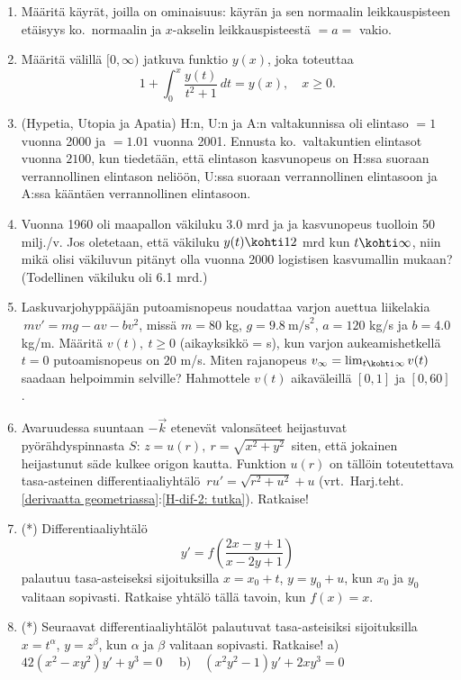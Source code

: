 \begin{enumerate}
\item
Määritä käyrät, joilla on ominaisuus: käyrän ja sen normaalin leikkauspisteen etäisyys ko.\
normaalin ja $x$-akselin leikkauspisteestä $=a=$ vakio.

\item {}
Määritä välillä $[0,\infty)$ jatkuva funktio $y(x)$, joka toteuttaa 
\[
1+\int_0^x \frac{y(t)}{t^2+1}\,dt = y(x), \quad x \ge 0.
\]

\item {}
(Hypetia, Utopia ja Apatia) H:n, U:n ja A:n valtakunnissa oli elintaso $=1$ vuonna 2000 ja
$=1.01$ vuonna 2001. Ennusta ko.\ valtakuntien elintasot vuonna $2100$, kun tiedetään, että
elintason kasvunopeus on H:ssa suoraan verrannollinen elintason neliöön, U:ssa suoraan
verrannollinen elintasoon ja A:ssa kääntäen verrannollinen elintasoon.

\item 
Vuonna 1960 oli maapallon väkiluku 3.0 mrd ja ja kasvunopeus tuolloin 50 milj./v. Jos
oletetaan, että väkiluku $y(t) \kohti 12$ mrd kun $t\kohti\infty$, niin mikä olisi väkiluvun
pitänyt olla vuonna 2000 logistisen kasvumallin mukaan? (Todellinen väkiluku oli 6.1 mrd.)

\item
Laskuvarjohyppääjän putoamisnopeus noudattaa varjon auettua liikelakia $\,mv'=mg-av-bv^2$,
missä $m=80$ kg, $g=9.8\ \text{m/s}^2$, $a=120$ kg/s ja $b=4.0$ kg/m. Määritä $v(t),\ t \ge 0$
(aikayksikkö = s), kun varjon aukeamishetkellä $t=0$ putoamisnopeus on $20$ m/s. 
Miten rajanopeus $v_\infty=\lim_{t\kohti\infty}v(t)$ saadaan helpoimmin selville? Hahmottele
$v(t)$ aikaväleillä $[0,1]$ ja $[0,60]$.

\item
Avaruudessa suuntaan $-\vec k$ etenevät valonsäteet heijastuvat pyörähdyspinnasta
$S:\,z=u(r),\ r=\sqrt{x^2+y^2}\,$ siten, että jokainen heijastunut säde kulkee origon
kautta. Funktion $u(r)$ on tällöin toteutettava tasa-asteinen differentiaaliyhtälö
$\,ru'=\sqrt{r^2+u^2}+u$
(vrt.\ Harj.teht.\,\ref{derivaatta geometriassa}:\ref{H-dif-2: tutka}). Ratkaise!

\item (*)
Differentiaaliyhtälö
\[
y'=f\left(\frac{2x-y+1}{x-2y+1}\right)
\]
palautuu tasa-asteiseksi sijoituksilla $x=x_0+t$, $y=y_0+u$, kun $x_0$ ja $y_0$ valitaan
sopivasti. Ratkaise yhtälö tällä tavoin, kun $f(x)=x$.

\item (*)
Seuraavat differentiaaliyhtälöt palautuvat tasa-asteisiksi sijoituksilla \newline
$x=t^\alpha$, $y=z^\beta$, kun $\alpha$ ja $\beta$ valitaan sopivasti. Ratkaise! \newline
a)\ \  $42(x^2-xy^2)y'+y^3=0 \quad$ b)\ \ $(x^2y^2-1)y'+2xy^3=0$


\end{enumerate}
